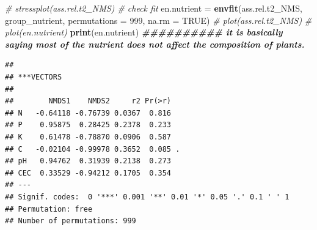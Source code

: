 \documentclass[
]{article}
\newenvironment{Shaded}{\begin{snugshade}}{\end{snugshade}}
\newcommand{\AttributeTok}[1]{\textcolor[rgb]{0.13,0.29,0.53}{#1}}
\newcommand{\CommentTok}[1]{\textcolor[rgb]{0.56,0.35,0.01}{\textit{#1}}}
\newcommand{\ConstantTok}[1]{\textcolor[rgb]{0.56,0.35,0.01}{#1}}
\newcommand{\DecValTok}[1]{\textcolor[rgb]{0.00,0.00,0.81}{#1}}
\newcommand{\DocumentationTok}[1]{\textcolor[rgb]{0.56,0.35,0.01}{\textbf{\textit{#1}}}}
\newcommand{\FunctionTok}[1]{\textcolor[rgb]{0.13,0.29,0.53}{\textbf{#1}}}
\newcommand{\NormalTok}[1]{#1}
\newcommand{\OtherTok}[1]{\textcolor[rgb]{0.56,0.35,0.01}{#1}}
\begin{document}
\begin{Shaded}
\begin{Highlighting}[]
\CommentTok{\# stressplot(ass.rel.t2\_NMS) \# check fit}
\NormalTok{en.nutrient }\OtherTok{=} \FunctionTok{envfit}\NormalTok{(ass.rel.t2\_NMS, group\_nutrient, }\AttributeTok{permutations =} \DecValTok{999}\NormalTok{, }\AttributeTok{na.rm =} \ConstantTok{TRUE}\NormalTok{)}
\CommentTok{\# plot(ass.rel.t2\_NMS) }
\CommentTok{\# plot(en.nutrient)}
\FunctionTok{print}\NormalTok{(en.nutrient) }\DocumentationTok{\#\#\#\#\#\#\#\#\#\# it is basically saying most of the nutrient does not affect the composition of plants.}
\end{Highlighting}
\end{Shaded}

\begin{verbatim}
## 
## ***VECTORS
## 
##        NMDS1    NMDS2     r2 Pr(>r)  
## N   -0.64118 -0.76739 0.0367  0.816  
## P    0.95875  0.28425 0.2378  0.233  
## K    0.61478 -0.78870 0.0906  0.587  
## C   -0.02104 -0.99978 0.3652  0.085 .
## pH   0.94762  0.31939 0.2138  0.273  
## CEC  0.33529 -0.94212 0.1705  0.354  
## ---
## Signif. codes:  0 '***' 0.001 '**' 0.01 '*' 0.05 '.' 0.1 ' ' 1
## Permutation: free
## Number of permutations: 999
\end{verbatim}
\end{document}
